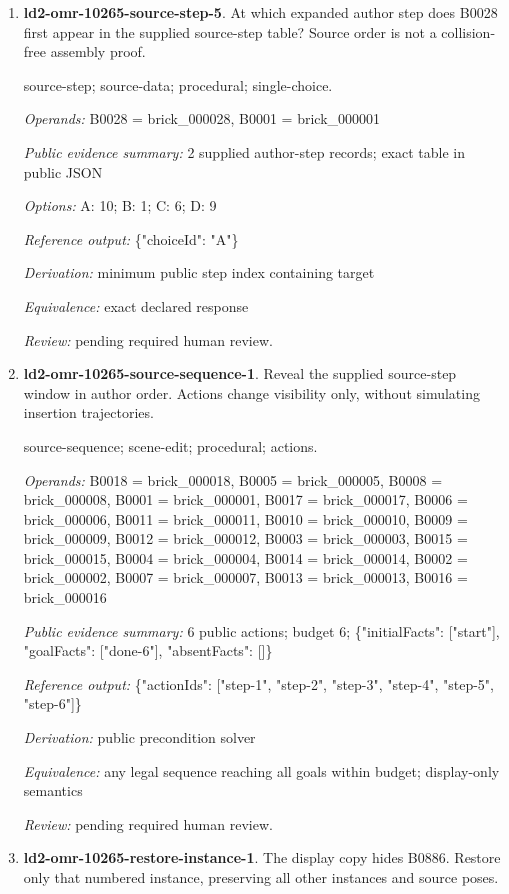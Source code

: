 \begin{enumerate}
\item \textbf{ld2-omr-10265-source-step-5}. At which expanded author step does B0028 first appear in the supplied source-step table? Source order is not a collision-free assembly proof.
\par{\small source-step; source-data; procedural; single-choice.\par\textit{Operands:} B0028 = brick\_000028, B0001 = brick\_000001\par\textit{Public evidence summary:} 2 supplied author-step records; exact table in public JSON\par\textit{Options:} A: 10; B: 1; C: 6; D: 9\par\textit{Reference output:} \{"choiceId": "A"\}\par\textit{Derivation:} minimum public step index containing target\par\textit{Equivalence:} exact declared response\par\textit{Review:} pending required human review.}
\item \textbf{ld2-omr-10265-source-sequence-1}. Reveal the supplied source-step window in author order. Actions change visibility only, without simulating insertion trajectories.
\par{\small source-sequence; scene-edit; procedural; actions.\par\textit{Operands:} B0018 = brick\_000018, B0005 = brick\_000005, B0008 = brick\_000008, B0001 = brick\_000001, B0017 = brick\_000017, B0006 = brick\_000006, B0011 = brick\_000011, B0010 = brick\_000010, B0009 = brick\_000009, B0012 = brick\_000012, B0003 = brick\_000003, B0015 = brick\_000015, B0004 = brick\_000004, B0014 = brick\_000014, B0002 = brick\_000002, B0007 = brick\_000007, B0013 = brick\_000013, B0016 = brick\_000016\par\textit{Public evidence summary:} 6 public actions; budget 6; \{"initialFacts": ["start"], "goalFacts": ["done-6"], "absentFacts": []\}\par\textit{Reference output:} \{"actionIds": ["step-1", "step-2", "step-3", "step-4", "step-5", "step-6"]\}\par\textit{Derivation:} public precondition solver\par\textit{Equivalence:} any legal sequence reaching all goals within budget; display-only semantics\par\textit{Review:} pending required human review.}
\item \textbf{ld2-omr-10265-restore-instance-1}. The display copy hides B0886. Restore only that numbered instance, preserving all other instances and source poses.

\end{enumerate}
